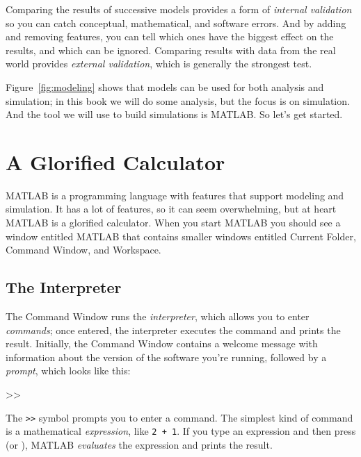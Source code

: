 
Comparing the results of successive models provides a form of \emph{internal  validation} so you can catch conceptual, mathematical, and software errors.  And by adding and removing features, you can tell which ones have the biggest effect on the results, and which can be ignored.
%
%
%
%
Comparing results with data from the real world provides \emph{external validation}, which is generally the strongest test.

Figure~\ref{fig:modeling} shows that models can be used for both analysis and simulation; in this book we will do some analysis, but the focus is on simulation.  And the tool we will use to build simulations is MATLAB.  So let's get started.


\section{A Glorified Calculator}
\label{calc}

MATLAB is a programming language with features that support modeling and simulation.  It has a lot of features, so it can seem overwhelming, but at heart MATLAB is a glorified calculator.  When you start MATLAB you should see a window entitled MATLAB that contains smaller windows entitled Current Folder, Command Window, and Workspace.


\subsection{The Interpreter}
The Command Window runs the \emph{interpreter}, which allows you
to enter \emph{commands}; once entered, the interpreter executes the command and prints the
result.
Initially, the Command Window contains a welcome message with information
about the version of the software you're running, followed by a \emph{prompt}, which looks like this:

\begin{code}
>>
\end{code}

The \lstinline{>>} symbol prompts you to enter a command.
The simplest kind of command is a mathematical \emph{expression},
like \lstinline{2 + 1}.
If you type an expression and then press  (or ), MATLAB
\emph{evaluates} the expression and prints the result.

